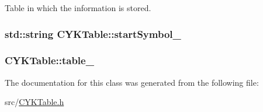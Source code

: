 \-Table in which the information is stored. 

\hypertarget{classCYKTable_a789892d83fa60dafe30168633dba22ca}{
\subsubsection[{start\-Symbol\-\_\-}]{\setlength{\rightskip}{0pt plus 5cm}std\-::string {\bf \-C\-Y\-K\-Table\-::start\-Symbol\-\_\-}}}\label{d6/dcd/classCYKTable_a789892d83fa60dafe30168633dba22ca}
\hypertarget{classCYKTable_a847f477bcba128dab98ac8cfa987fd04}{
\subsubsection[{table\-\_\-}]{ {\bf \-C\-Y\-K\-Table\-::table\-\_\-}}}\label{d6/dcd/classCYKTable_a847f477bcba128dab98ac8cfa987fd04}


\-The documentation for this class was generated from the following file\-:\begin{DoxyCompactItemize}
\item 
src/\hyperlink{CYKTable_8h}{\-C\-Y\-K\-Table.\-h}\end{DoxyCompactItemize}

